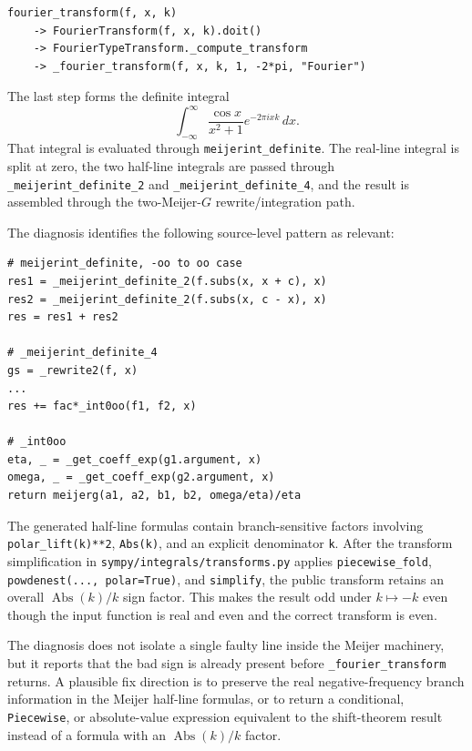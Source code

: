 \documentclass[11pt]{article}
\begin{document}
\begin{lstlisting}[style=bugpython]
fourier_transform(f, x, k)
    -> FourierTransform(f, x, k).doit()
    -> FourierTypeTransform._compute_transform
    -> _fourier_transform(f, x, k, 1, -2*pi, "Fourier")
\end{lstlisting}

The last step forms the definite integral
\[
    \int_{-\infty}^{\infty}
    \frac{\cos x}{x^2+1}e^{-2\pi i x k}\,dx.
\]
That integral is evaluated through \texttt{meijerint\_definite}. The real-line
integral is split at zero, the two half-line integrals are passed through
\texttt{\_meijerint\_definite\_2} and \texttt{\_meijerint\_definite\_4}, and the
result is assembled through the two-Meijer-\(G\) rewrite/integration path.

The diagnosis identifies the following source-level pattern as relevant:

\begin{lstlisting}[style=bugpython]
# meijerint_definite, -oo to oo case
res1 = _meijerint_definite_2(f.subs(x, x + c), x)
res2 = _meijerint_definite_2(f.subs(x, c - x), x)
res = res1 + res2

# _meijerint_definite_4
gs = _rewrite2(f, x)
...
res += fac*_int0oo(f1, f2, x)

# _int0oo
eta, _ = _get_coeff_exp(g1.argument, x)
omega, _ = _get_coeff_exp(g2.argument, x)
return meijerg(a1, a2, b1, b2, omega/eta)/eta
\end{lstlisting}

The generated half-line formulas contain branch-sensitive factors involving
\texttt{polar\_lift(k)**2}, \texttt{Abs(k)}, and an explicit denominator
\texttt{k}. After the transform simplification in
\nolinkurl{sympy/integrals/transforms.py} applies \texttt{piecewise\_fold},
\texttt{powdenest(..., polar=True)}, and \texttt{simplify}, the public transform
retains an overall \(\operatorname{Abs}(k)/k\) sign factor. This makes the
result odd under \(k\mapsto -k\) even though the input function is real and even
and the correct transform is even.

The diagnosis does not isolate a single faulty line inside the Meijer machinery,
but it reports that the bad sign is already present before
\texttt{\_fourier\_transform} returns. A plausible fix direction is to preserve
the real negative-frequency branch information in the Meijer half-line formulas,
or to return a conditional, \texttt{Piecewise}, or absolute-value expression
equivalent to the shift-theorem result instead of a formula with an
\(\operatorname{Abs}(k)/k\) factor.
\end{document}
